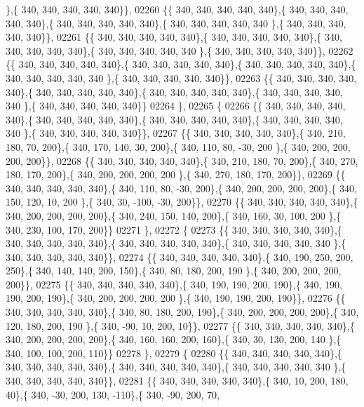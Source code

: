 \begin{DoxyCode}
      \},\{ 340, 340, 340, 340, 340\}\},
02260 \{\{ 340, 340, 340, 340, 340\},\{ 340, 340, 340, 340, 340\},\{ 340, 340, 340, 340, 340\},\{ 340, 340, 340, 340, 340
      \},\{ 340, 340, 340, 340, 340\}\},
02261 \{\{ 340, 340, 340, 340, 340\},\{ 340, 340, 340, 340, 340\},\{ 340, 340, 340, 340, 340\},\{ 340, 340, 340, 340, 340
      \},\{ 340, 340, 340, 340, 340\}\},
02262 \{\{ 340, 340, 340, 340, 340\},\{ 340, 340, 340, 340, 340\},\{ 340, 340, 340, 340, 340\},\{ 340, 340, 340, 340, 340
      \},\{ 340, 340, 340, 340, 340\}\},
02263 \{\{ 340, 340, 340, 340, 340\},\{ 340, 340, 340, 340, 340\},\{ 340, 340, 340, 340, 340\},\{ 340, 340, 340, 340, 340
      \},\{ 340, 340, 340, 340, 340\}\}
02264 \},
02265 \{
02266 \{\{ 340, 340, 340, 340, 340\},\{ 340, 340, 340, 340, 340\},\{ 340, 340, 340, 340, 340\},\{ 340, 340, 340, 340, 340
      \},\{ 340, 340, 340, 340, 340\}\},
02267 \{\{ 340, 340, 340, 340, 340\},\{ 340, 210, 180,  70, 200\},\{ 340, 170, 140,  30, 200\},\{ 340, 110,  80, -30, 200
      \},\{ 340, 200, 200, 200, 200\}\},
02268 \{\{ 340, 340, 340, 340, 340\},\{ 340, 210, 180,  70, 200\},\{ 340, 270, 180, 170, 200\},\{ 340, 200, 200, 200, 200
      \},\{ 340, 270, 180, 170, 200\}\},
02269 \{\{ 340, 340, 340, 340, 340\},\{ 340, 110,  80, -30, 200\},\{ 340, 200, 200, 200, 200\},\{ 340, 150, 120,  10, 200
      \},\{ 340,  30, -100, -30, 200\}\},
02270 \{\{ 340, 340, 340, 340, 340\},\{ 340, 200, 200, 200, 200\},\{ 340, 240, 150, 140, 200\},\{ 340, 160,  30, 100, 200
      \},\{ 340, 230, 100, 170, 200\}\}
02271 \},
02272 \{
02273 \{\{ 340, 340, 340, 340, 340\},\{ 340, 340, 340, 340, 340\},\{ 340, 340, 340, 340, 340\},\{ 340, 340, 340, 340, 340
      \},\{ 340, 340, 340, 340, 340\}\},
02274 \{\{ 340, 340, 340, 340, 340\},\{ 340, 190, 250, 200, 250\},\{ 340, 140, 140, 200, 150\},\{ 340,  80, 180, 200, 190
      \},\{ 340, 200, 200, 200, 200\}\},
02275 \{\{ 340, 340, 340, 340, 340\},\{ 340, 190, 190, 200, 190\},\{ 340, 190, 190, 200, 190\},\{ 340, 200, 200, 200, 200
      \},\{ 340, 190, 190, 200, 190\}\},
02276 \{\{ 340, 340, 340, 340, 340\},\{ 340,  80, 180, 200, 190\},\{ 340, 200, 200, 200, 200\},\{ 340, 120, 180, 200, 190
      \},\{ 340, -90,  10, 200,  10\}\},
02277 \{\{ 340, 340, 340, 340, 340\},\{ 340, 200, 200, 200, 200\},\{ 340, 160, 160, 200, 160\},\{ 340,  30, 130, 200, 140
      \},\{ 340, 100, 100, 200, 110\}\}
02278 \},
02279 \{
02280 \{\{ 340, 340, 340, 340, 340\},\{ 340, 340, 340, 340, 340\},\{ 340, 340, 340, 340, 340\},\{ 340, 340, 340, 340, 340
      \},\{ 340, 340, 340, 340, 340\}\},
02281 \{\{ 340, 340, 340, 340, 340\},\{ 340,  10, 200, 180,  40\},\{ 340, -30, 200, 130, -110\},\{ 340, -90, 200,  70,  

\end{DoxyCode}
